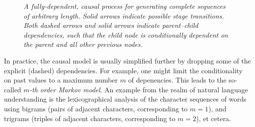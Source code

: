 \documentclass[a4paper]{article}
\begin{document}
\begin{figure}[hbt]
\centering
{}
\caption{\em A fully-dependent, causal process for generating complete sequences of arbitrary length.
Solid arrows indicate possible stage transitions.
Both dashed arrows and solid arrows indicate parent--child dependencies, such that the child node is conditionally dependent on the parent and all other previous nodes.}
\label{fig:causal-process}
\end{figure}


In practice, the causal model is usually simplified further by 
dropping some of the explicit (dashed) dependencies.
For example, one might limit the 
conditionality on past values to a maximum number $m$ of depenencies.
This leads to the so-called {\em $m$-th order Markov model}.
An example from the realm of natural language understanding is the lexicographical analysis of the character
sequences of words using bigrams (pairs of adjacent characters, corresponding to $m=1$), and trigrams 
(triples of adjacent characters, corresponding to $m=2$), et cetera.
\end{document}
